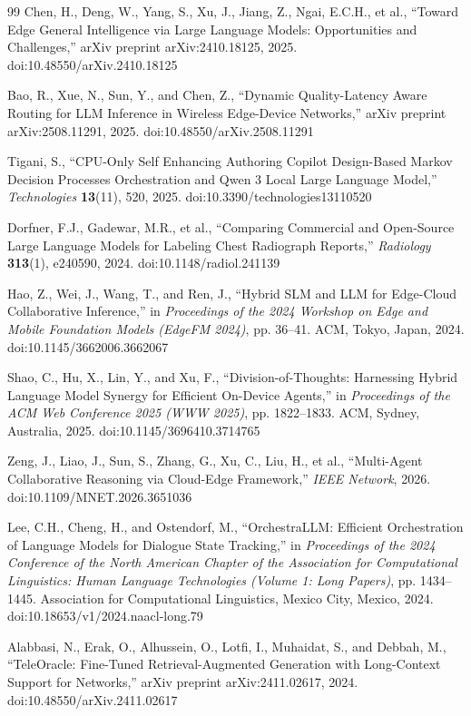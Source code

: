 \begin{thebibliography}{99}
Chen, H., Deng, W., Yang, S., Xu, J., Jiang, Z., Ngai, E.C.H., et al., ``Toward Edge General Intelligence via Large Language Models: Opportunities and Challenges,'' arXiv preprint arXiv:2410.18125, 2025. doi:10.48550/arXiv.2410.18125

Bao, R., Xue, N., Sun, Y., and Chen, Z., ``Dynamic Quality-Latency Aware Routing for LLM Inference in Wireless Edge-Device Networks,'' arXiv preprint arXiv:2508.11291, 2025. doi:10.48550/arXiv.2508.11291

Tigani, S., ``CPU-Only Self Enhancing Authoring Copilot Design-Based Markov Decision Processes Orchestration and Qwen 3 Local Large Language Model,'' \textit{Technologies} \textbf{13}(11), 520, 2025. doi:10.3390/technologies13110520

Dorfner, F.J., Gadewar, M.R., et al., ``Comparing Commercial and Open-Source Large Language Models for Labeling Chest Radiograph Reports,'' \textit{Radiology} \textbf{313}(1), e240590, 2024. doi:10.1148/radiol.241139

Hao, Z., Wei, J., Wang, T., and Ren, J., ``Hybrid SLM and LLM for Edge-Cloud Collaborative Inference,'' in \textit{Proceedings of the 2024 Workshop on Edge and Mobile Foundation Models (EdgeFM 2024)}, pp. 36--41. ACM, Tokyo, Japan, 2024. doi:10.1145/3662006.3662067

Shao, C., Hu, X., Lin, Y., and Xu, F., ``Division-of-Thoughts: Harnessing Hybrid Language Model Synergy for Efficient On-Device Agents,'' in \textit{Proceedings of the ACM Web Conference 2025 (WWW 2025)}, pp. 1822--1833. ACM, Sydney, Australia, 2025. doi:10.1145/3696410.3714765

Zeng, J., Liao, J., Sun, S., Zhang, G., Xu, C., Liu, H., et al., ``Multi-Agent Collaborative Reasoning via Cloud-Edge Framework,'' \textit{IEEE Network}, 2026. doi:10.1109/MNET.2026.3651036

Lee, C.H., Cheng, H., and Ostendorf, M., ``OrchestraLLM: Efficient Orchestration of Language Models for Dialogue State Tracking,'' in \textit{Proceedings of the 2024 Conference of the North American Chapter of the Association for Computational Linguistics: Human Language Technologies (Volume 1: Long Papers)}, pp. 1434--1445. Association for Computational Linguistics, Mexico City, Mexico, 2024. doi:10.18653/v1/2024.naacl-long.79

Alabbasi, N., Erak, O., Alhussein, O., Lotfi, I., Muhaidat, S., and Debbah, M., ``TeleOracle: Fine-Tuned Retrieval-Augmented Generation with Long-Context Support for Networks,'' arXiv preprint arXiv:2411.02617, 2024. doi:10.48550/arXiv.2411.02617


\end{thebibliography}
